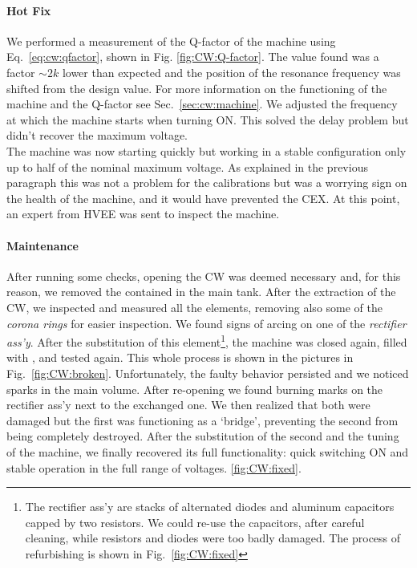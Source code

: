 \begin{refsection}
        \paragraph{Hot Fix}
        We performed a measurement of the Q-factor of the machine using Eq.~\ref{eq:cw:qfactor}, shown in Fig. \ref{fig:CW:Q-factor}.  
        The value found was a factor $\sim2k$ lower than expected and the position of the resonance frequency was shifted from the design value.
        For more information on the functioning of the machine and the Q-factor see Sec.~\ref{sec:cw:machine}.
        We adjusted the frequency at which the machine starts when turning ON. 
        This solved the delay problem but didn't recover the maximum voltage. \\
        The machine was now starting quickly but working in a stable configuration only up to half of the nominal maximum voltage.
        As explained in the previous paragraph this was not a problem for the  calibrations but was a worrying sign on the health of the machine, and it would have prevented the CEX.
        At this point, an expert from HVEE was sent to inspect the machine.

        \paragraph{Maintenance}
        After running some checks, opening the CW was deemed necessary and, for this reason, we removed the  contained in the main tank. 
        After the extraction of the CW, we inspected and measured all the elements, removing also some of the \textit{corona rings} for easier inspection. 
        We found signs of arcing on one of the \textit{rectifier ass'y}. 
        After the substitution of this element\footnote{The rectifier ass'y are stacks of alternated diodes and aluminum capacitors capped by two resistors. We could re-use the capacitors, after careful cleaning, while resistors and diodes were too badly damaged. The process of refurbishing is shown in Fig.~\ref{fig:CW:fixed}}, the machine was closed again, filled with , and tested again.
        This whole process is shown in the pictures in Fig.~\ref{fig:CW:broken}.
        Unfortunately, the faulty behavior persisted and we noticed sparks in the main volume. 
        After re-opening we found burning marks on the rectifier ass'y next to the exchanged one.
        We then realized that both were damaged but the first was functioning as a `bridge', preventing the second from being completely destroyed. 
        After the substitution of the second and the tuning of the machine, we finally recovered its full functionality: quick switching ON and stable operation in the full range of voltages.
        \ref{fig:CW:fixed}.


\end{refsection}
